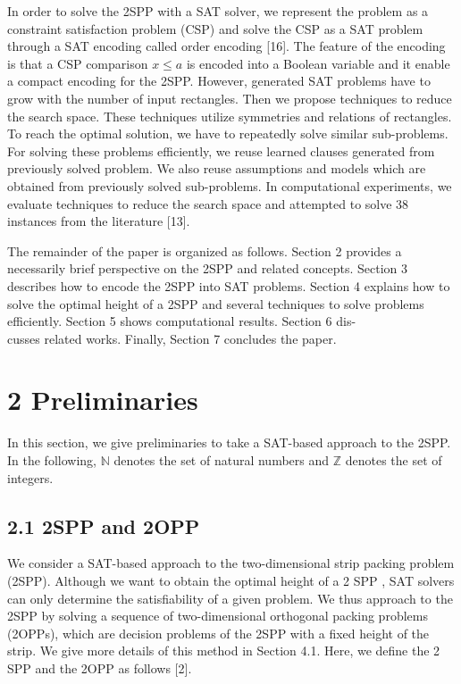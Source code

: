 \documentclass[10pt]{article}
\begin{document}
In order to solve the 2SPP with a SAT solver, we represent the problem as a constraint satisfaction problem (CSP) and solve the CSP as a SAT problem through a SAT encoding called order encoding [16]. The feature of the encoding is that a CSP comparison $x \leq a$ is encoded into a Boolean variable and it enable a compact encoding for the 2SPP. However, generated SAT problems have to grow with the number of input rectangles. Then we propose techniques to reduce the search space. These techniques utilize symmetries and relations of rectangles. To reach the optimal solution, we have to repeatedly solve similar sub-problems. For solving these problems efficiently, we reuse learned clauses generated from previously solved problem. We also reuse assumptions and models which are obtained from previously solved sub-problems. In computational experiments, we evaluate techniques to reduce the search space and attempted to solve 38 instances from the literature [13].

The remainder of the paper is organized as follows. Section 2 provides a necessarily brief perspective on the 2SPP and related concepts. Section 3 describes how to encode the 2SPP into SAT problems. Section 4 explains how to solve the optimal height of a 2SPP and several techniques to solve problems efficiently. Section 5 shows computational results. Section 6 dis-\\
cusses related works. Finally, Section 7 concludes the paper.

\section*{2 Preliminaries}
In this section, we give preliminaries to take a SAT-based approach to the 2SPP. In the following, $\mathbb{N}$ denotes the set of natural numbers and $\mathbb{Z}$ denotes the set of integers.

\subsection*{2.1 2SPP and 2OPP}
We consider a SAT-based approach to the two-dimensional strip packing problem (2SPP). Although we want to obtain the optimal height of a 2 SPP , SAT solvers can only determine the satisfiability of a given problem. We thus approach to the 2SPP by solving a sequence of two-dimensional orthogonal packing problems (2OPPs), which are decision problems of the 2SPP with a fixed height of the strip. We give more details of this method in Section 4.1. Here, we define the 2 SPP and the 2OPP as follows [2].
\end{document}
